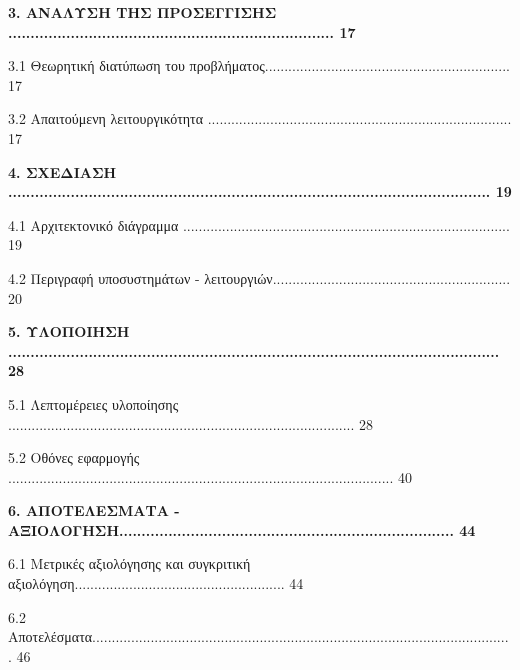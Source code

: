 \documentclass{report}
\begin{document}
\begin{list}
\textbf{3. ΑΝΑΛΥΣΗ ΤΗΣ ΠΡΟΣΕΓΓΙΣΗΣ ......................................................................... 17}
   \vspace{2mm} 
    \item{3.1 Θεωρητική διατύπωση του προβλήματος............................................................... 17}
    \item{3.2 Απαιτούμενη λειτουργικότητα .............................................................................. 17}
    \vspace{5mm}
\end{list}

\begin{list}
\textbf{4. ΣΧΕΔΙΑΣΗ ............................................................................................................ 19}
   \vspace{2mm} 
    \item{4.1 Αρχιτεκτονικό διάγραμμα .................................................................................... 19}
    \item{4.2 Περιγραφή υποσυστημάτων - λειτουργιών............................................................. 20}
    \vspace{5mm}
\end{list}

\begin{list}
\textbf{5. ΥΛΟΠΟΙΗΣΗ .............................................................................................................. 28}
   \vspace{2mm} 
    \item{5.1 Λεπτομέρειες υλοποίησης  ......................................................................................... 28}
    \item{5.2 Οθόνες εφαρμογής ................................................................................................... 40}
    \vspace{5mm}
\end{list}

\begin{list}
\textbf{6. ΑΠΟΤΕΛΕΣΜΑΤΑ - ΑΞΙΟΛΟΓΗΣΗ........................................................................... 44}
   \vspace{2mm} 
    \item{6.1 Μετρικές αξιολόγησης και συγκριτική αξιολόγηση...................................................... 44}
    \item{6.2 Αποτελέσματα............................................................................................................ 46}
    \vspace{5mm}
\end{list}
\end{document}
